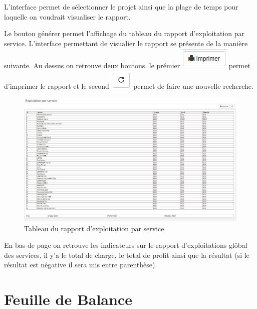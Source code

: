 \documentclass[12pt,a4paper]{report}
\begin{document}
L'interface permet de sélectionner le projet ainsi que la plage de temps pour laquelle on voudrait visualiser le rapport. 

Le bouton générer permet l'affichage du tableau du rapport d'exploitation par service.
L'interface permettant de visualier le rapport se présente de la manière suivante. Au dessus on retrouve deux boutons. le prémier 
\includegraphics[scale=0.7]{pic/Print.png} permet d'imprimer le rapport et le second \includegraphics[scale=0.7]{pic/refresh.png} permet de faire une nouvelle recherche.

\begin{figure}[h]
\begin{center}
\includegraphics[width=14cm]{pic/ExploiService.png}
\end{center}
\caption{Tableau du rapport d'exploitation par service}
\label{Tableau du rapport d'exploitation par service}
\end{figure}


En bas de page on retrouve les indicateurs sur le rapport d'exploitations glôbal des services, il y'a le total de charge, le total de profit ainsi que la résultat (si le résultat est négative il sera mis entre parenthèse). 

\newpage
\section{Feuille de Balance}


\newpage
\end{document}
